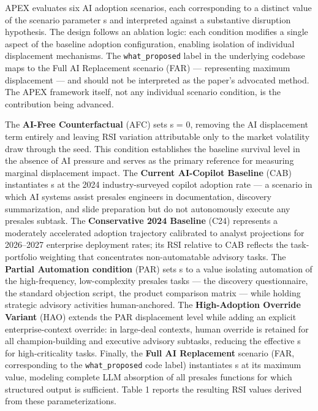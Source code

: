 \documentclass[10pt, conference]{IEEEtran}
\begin{document}
\label{sec:experimental\_conditions\_and\_scenario\_par}

APEX evaluates six AI adoption scenarios, each corresponding to a distinct value of the scenario parameter s and interpreted against a substantive disruption hypothesis. The design follows an ablation logic: each condition modifies a single aspect of the baseline adoption configuration, enabling isolation of individual displacement mechanisms. The \texttt{what\_proposed} label in the underlying codebase maps to the Full AI Replacement scenario (FAR) --- representing maximum displacement --- and should not be interpreted as the paper's advocated method. The APEX framework itself, not any individual scenario condition, is the contribution being advanced.

The \textbf{AI-Free Counterfactual} (AFC) sets s = 0, removing the AI displacement term entirely and leaving RSI variation attributable only to the market volatility draw through the seed. This condition establishes the baseline survival level in the absence of AI pressure and serves as the primary reference for measuring marginal displacement impact. The \textbf{Current AI-Copilot Baseline} (CAB) instantiates s at the 2024 industry-surveyed copilot adoption rate --- a scenario in which AI systems assist presales engineers in documentation, discovery summarization, and slide preparation but do not autonomously execute any presales subtask. The \textbf{Conservative 2024 Baseline} (C24) represents a moderately accelerated adoption trajectory calibrated to analyst projections for 2026--2027 enterprise deployment rates; its RSI relative to CAB reflects the task-portfolio weighting that concentrates non-automatable advisory tasks. The \textbf{Partial Automation condition} (PAR) sets s to a value isolating automation of the high-frequency, low-complexity presales tasks --- the discovery questionnaire, the standard objection script, the product comparison matrix --- while holding strategic advisory activities human-anchored. The \textbf{High-Adoption Override Variant} (HAO) extends the PAR displacement level while adding an explicit enterprise-context override: in large-deal contexts, human override is retained for all champion-building and executive advisory subtasks, reducing the effective s for high-criticality tasks. Finally, the \textbf{Full AI Replacement} scenario (FAR, corresponding to the \texttt{what\_proposed} code label) instantiates s at its maximum value, modeling complete LLM absorption of all presales functions for which structured output is sufficient. Table 1 reports the resulting RSI values derived from these parameterizations.
\end{document}
